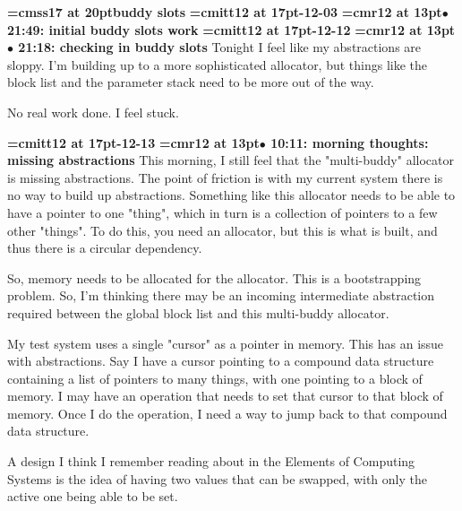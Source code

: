 {\medskip\noindent\bf\font\titlefont=cmss17 at 20pt\titlefont buddy slots}\medskip
{\medskip\noindent\bf\font\titlefont=cmitt12 at 17pt-12-03}\medskip
{\smallskip\noindent\bf\font\titlefont=cmr12 at 13pt\titlefont $\bullet$ 21:49: initial buddy slots work}\smallskip
{\medskip\noindent\bf\font\titlefont=cmitt12 at 17pt-12-12}\medskip
{\smallskip\noindent\bf\font\titlefont=cmr12 at 13pt\titlefont $\bullet$ 21:18: checking in buddy slots}\smallskip
Tonight I feel like my abstractions are sloppy. I'm building up to a more sophisticated allocator, but things like the block list and the parameter stack need to be more out of the way.
\par

No real work done. I feel stuck.
\par

{\medskip\noindent\bf\font\titlefont=cmitt12 at 17pt-12-13}\medskip
{\smallskip\noindent\bf\font\titlefont=cmr12 at 13pt\titlefont $\bullet$ 10:11: morning thoughts: missing abstractions}\smallskip
This morning, I still feel that the "multi-buddy" allocator is missing abstractions. The point of friction is with my current system there is no way to build up abstractions. Something like this allocator needs to be able to have a pointer to one "thing", which in turn is a collection of pointers to a few other "things". To do this, you need an allocator, but this is what is built, and thus there is a circular dependency.
\par

So, memory needs to be allocated for the allocator. This is a bootstrapping problem. So, I'm thinking there may be an incoming intermediate abstraction required between the global block list and this multi-buddy allocator.
\par

My test system uses a single "cursor" as a pointer in memory. This has an issue with abstractions. Say I have a cursor pointing to a compound data structure containing a list of pointers to many things, with one pointing to a block of memory. I may have an operation that needs to set that cursor to that block of memory. Once I do the operation, I need a way to jump back to that compound data structure.
\par

A design I think I remember reading about in the Elements of Computing Systems is the idea of having two values that can be swapped, with only the active one being able to be set.
\par

